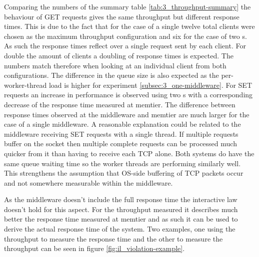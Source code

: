         Comparing the numbers of the summary table \ref{tab:3_throughput-summary} the behaviour of GET requests gives
        the same throughput but different response times. This is due to the fact that for the case of a single \mw{}
        twelve total clients were chosen as the maximum throughput configuration and six for the case of two \mw{}s. As
        such the response times reflect over a single request sent by each client. For double the amount of clients a
        doubling of response times is expected. The numbers match therefore when looking at an individual client from
        both configurations. The difference in the queue size is also expected as the per-worker-thread load is higher
        for experiment \ref{subsec:3_one-middleware}.\newline
        For SET requests an increase in performance is observed using two \mw{}s with a corresponding decrease of the
        response time measured at memtier. The difference between response times observed at the middleware and memtier
        are much larger for the case of a single middleware. A reasonable explanation could be related to the middleware
        receiving SET requests with a single thread. If multiple requests buffer on the socket then multiple complete
        requests can be processed much quicker from it than having to receive each TCP alone. Both systems do have the
        same queue waiting time so the worker threads are performing similarly well. This strengthens the assumption
        that OS-side buffering of TCP packets occur and not somewhere measurable within the middleware.

        As the middleware doesn't include the full response time the interactive law doesn't hold for this aspect. For
        the throughput measured it describes much better the response time measured at memtier and as such it can be
        used to derive the actual response time of the system. Two examples, one using the throughput to measure the
        response time and the other to measure the throughput can be seen in figure \ref{fig:il_violation-example}.

